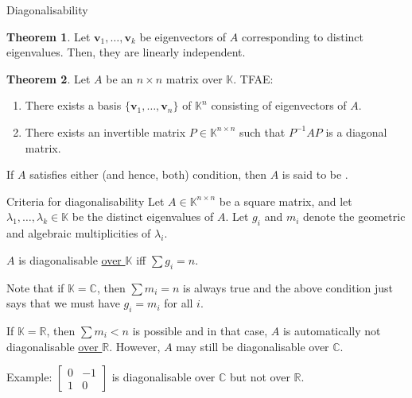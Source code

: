 \documentclass[dvipsnames]{beamer}
\theoremstyle{definition}
\newtheorem{thm}{Theorem}
\begin{document}
\begin{frame}{Diagonalisability}
    \begin{thm}
        Let $\mathbf{v}_{1}, \ldots, \mathbf{v}_{k}$ be eigenvectors of $A$ corresponding to distinct eigenvalues. \pause Then, they are linearly independent.
    \end{thm} \pause

    \begin{thm}
        Let $A$ be an $n \times n$ matrix over $\mathbb{K}$. TFAE: \pause
        \begin{enumerate}[<+->]
            \item There exists a basis $\{\mathbf{v}_{1}, \ldots, \mathbf{v}_{n}\}$ of $\mathbb{K}^{n}$ consisting of eigenvectors of $A$.
            \item There exists an invertible matrix $P \in \mathbb{K}^{n \times n}$ such that $P^{-1} A P$ is a diagonal matrix.
        \end{enumerate}
    \end{thm} \pause

    If $A$ satisfies either (and hence, both) condition, then $A$ is said to be .
\end{frame}
\begin{frame}{Criteria for diagonalisability}
    Let $A \in \mathbb{K}^{n \times n}$ be a square matrix, and let $\lambda_{1}, \ldots, \lambda_{k} \in \mathbb{K}$ be the distinct eigenvalues of $A$. \newline \pause
    Let $g_{i}$ and $m_{i}$ denote the geometric and algebraic multiplicities of $\lambda_{i}$. \pause 
    
    $A$ is diagonalisable \underline{over $\mathbb{K}$} iff $\boxed{\sum g_{i} = n}$. \pause

    Note that if $\mathbb{K} = \mathbb{C}$, then $\sum m_{i} = n$ is always true \pause and the above condition just says that we must have $g_{i} = m_{i}$ for all $i$. \pause

    If $\mathbb{K} = \mathbb{R}$, then $\sum m_{i} < n$ is possible \pause and in that case, $A$ is automatically not diagonalisable \underline{over $\mathbb{R}$}. \pause However, $A$ may still be diagonalisable over $\mathbb{C}$. \pause

    Example: $\begin{bmatrix}
        0 & -1 \\
        1 & 0
    \end{bmatrix}$ is diagonalisable over $\mathbb{C}$ but not over $\mathbb{R}$.
\end{frame}
\end{document}
